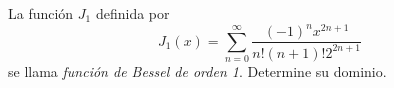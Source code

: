 \item La función $J_1$ definida por 
    \[ J_1(x) = \sum_{n=0}^\infty \frac{(-1)^n x^{2n+1}}{n!(n+1)! 2^{2n+1}} \]
    se llama \textit{función de Bessel de orden 1}. Determine su dominio.
